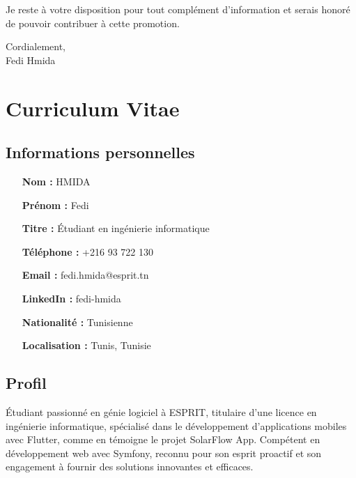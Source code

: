 \documentclass[12pt,a4paper]{article}
\begin{document}
Je reste à votre disposition pour tout complément d'information et serais honoré de pouvoir contribuer à cette promotion.

\vspace{1cm}

\noindent
Cordialement,\\
\vspace{1cm}
Fedi Hmida

\newpage

\section{Curriculum Vitae}
\label{sec:cv}

\subsection{Informations personnelles}
\begin{itemize}[leftmargin=3cm]
    \item[\textbf{Nom :}] HMIDA
    \item[\textbf{Prénom :}] Fedi
    \item[\textbf{Titre :}] Étudiant en ingénierie informatique
    \item[\textbf{Téléphone :}] +216 93 722 130
    \item[\textbf{Email :}] fedi.hmida@esprit.tn
    \item[\textbf{LinkedIn :}] fedi-hmida
    \item[\textbf{Nationalité :}] Tunisienne
    \item[\textbf{Localisation :}] Tunis, Tunisie
\end{itemize}

\subsection{Profil}
Étudiant passionné en génie logiciel à ESPRIT, titulaire d'une licence en ingénierie informatique, spécialisé dans le développement d’applications mobiles avec Flutter, comme en témoigne le projet SolarFlow App. Compétent en développement web avec Symfony, reconnu pour son esprit proactif et son engagement à fournir des solutions innovantes et efficaces.
\end{document}
